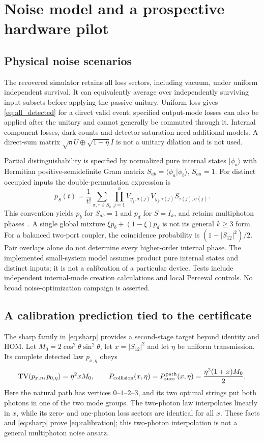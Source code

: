 \section{Noise model and a prospective hardware pilot}\label{sec:pilot}
\subsection{Physical noise scenarios}
The recovered simulator retains all loss sectors, including vacuum, under uniform independent survival. It can equivalently average over independently surviving input subsets before applying the passive unitary. Uniform loss gives \cref{eq:all_detected} for a direct valid event; specified output-mode losses can also be applied after the unitary and cannot generally be commuted through it. Internal component losses, dark counts and detector saturation need additional models. A direct-sum matrix $\sqrt\eta U\oplus\sqrt{1-\eta}I$ is not a unitary dilation and is not used.

Partial distinguishability is specified by normalized pure internal states $|\phi_a\rangle$ with Hermitian positive-semidefinite Gram matrix $S_{ab}=\langle\phi_a|\phi_b\rangle$, $S_{aa}=1$. For distinct occupied inputs the double-permutation expression is
\begin{equation}
 p_S(t)=\frac1{t!}\sum_{\sigma,\tau\in S_k}
 \prod_{j=1}^k V_{y_j,\sigma(j)}\overline{V_{y_j,\tau(j)}}
 S_{\tau(j),\sigma(j)}.\label{eq:partial}
\end{equation}
This convention yields $p_b$ for $S_{ab}=1$ and $p_d$ for $S=I_k$, and retains multiphoton phases~\cite{tichy2015}. A single global mixture $\xi p_b+(1-\xi)p_d$ is not its general $k\ge3$ form. For a balanced two-port coupler, the coincidence probability is $(1-|S_{12}|^2)/2$. Pair overlaps alone do not determine every higher-order internal phase. The implemented small-system model assumes product pure internal states and distinct inputs; it is not a calibration of a particular device. Tests include independent internal-mode creation calculations and local Perceval controls. No broad noise-optimization campaign is asserted.

\subsection{A calibration prediction tied to the certificate}
The sharp family in \cref{eq:sharp} provides a second-stage target beyond identity and HOM. Let $M_0=2\cos^2\theta\sin^2\theta$, let $x=|S_{12}|^2$ and let $\eta$ be uniform transmission. Its complete detected law $p_{x,\eta}$ obeys
\begin{equation}
 \operatorname{TV}(p_{x,\eta},p_{0,\eta})=\eta^2 xM_0,\qquad
 P_{\rm collision}(x,\eta)=P_{\mathrm{succ}}^{\rm path}(x,\eta)
 =\frac{\eta^2(1+x)M_0}{2}.\label{eq:calibration}
\end{equation}
Here the natural path has vertices $0$--$1$--$2$--$3$, and its two optimal strings put both photons in one of the two mode groups. The two-photon law interpolates linearly in $x$, while its zero- and one-photon loss sectors are identical for all $x$. These facts and \cref{eq:sharp} prove \cref{eq:calibration}; this two-photon interpolation is not a general multiphoton noise ansatz.


